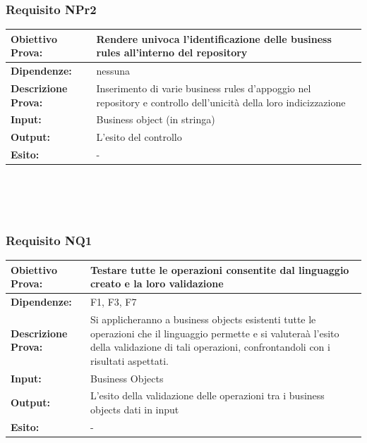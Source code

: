 \documentclass[11pt,titlepage,a4paper]{report}
\begin{document}
\subsubsection{Requisito NPr2}
\begin{tabular}{||p{4.5cm}||p{7.5cm}||}
\hline
{\textbf{Obiettivo Prova:}}& Rendere univoca l'identificazione delle business rules all'interno del repository \\ \hline
{\textbf{Dipendenze:}}& nessuna \\ \hline
{\textbf{Descrizione Prova:}}& Inserimento di varie business rules d'appoggio nel repository e controllo dell'unicit\`a della loro indicizzazione \\ \hline
{\textbf{Input:}}& Business object (in stringa) \\ \hline 
{\textbf{Output:}}& L'esito del controllo\\ \hline
{\textbf{Esito:}}& - \\ \hline
\end{tabular} \\
\\
\\
\subsubsection{Requisito NQ1}
\begin{tabular}{||p{4.5cm}||p{7.5cm}||}
\hline
{\textbf{Obiettivo Prova:}}& Testare tutte le operazioni consentite dal linguaggio creato e la loro validazione\\ \hline
{\textbf{Dipendenze:}}& F1, F3, F7 \\ \hline
{\textbf{Descrizione Prova:}}& Si applicheranno a business objects esistenti tutte le operazioni che il linguaggio permette e si valutera\`a l'esito della validazione di tali operazioni, confrontandoli con i risultati aspettati.  \\ \hline
{\textbf{Input:}}& Business Objects \\ \hline
{\textbf{Output:}}& L'esito della validazione delle operazioni tra i business objects dati in input\\ \hline
{\textbf{Esito:}}& - \\ \hline
\end{tabular} \\
\\
\\
\end{document}
